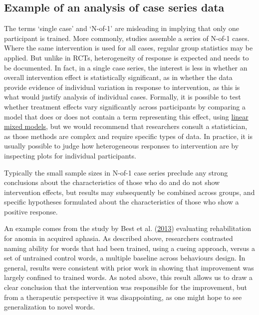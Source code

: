 \documentclass{krantz}
\begin{document}
\hypertarget{example-of-an-analysis-of-case-series-data}{%
\subsection{Example of an analysis of case series data}\label{example-of-an-analysis-of-case-series-data}}

The terms `single case' and `N-of-1' are misleading in implying that only one participant is trained. More commonly, studies assemble a series of N-of-1 cases. Where the same intervention is used for all cases, regular group statistics may be applied. But unlike in RCTs, heterogeneity of response is expected and needs to be documented. In fact, in a single case series, the interest is less in whether an overall intervention effect is statistically significant, as in whether the data provide evidence of individual variation in response to intervention, as this is what would justify analysis of individual cases. Formally, it is possible to test whether treatment effects vary significantly across participants by comparing a model that does or does not contain a term representing this effect, using \href{https://stackoverflow.com/questions/24019807/how-to-compare-a-model-with-no-random-effects-to-a-model-with-a-random-effect-us}{linear mixed models}, but we would recommend that researchers consult a statistician, as those methods are complex and require specific types of data. In practice, it is usually possible to judge how heterogeneous responses to intervention are by inspecting plots for individual participants.

Typically the small sample sizes in N-of-1 case series preclude any strong conclusions about the characteristics of those who do and do not show intervention effects, but results may subsequently be combined across groups, and specific hypotheses formulated about the characteristics of those who show a positive response.

An example comes from the study by Best et al. (\protect\hyperlink{ref-best2013}{2013}) evaluating rehabilitation for anomia in acquired aphasia. As described above, researchers contrasted naming ability for words that had been trained, using a cueing approach, versus a set of untrained control words, a multiple baseline across behaviours design. In general, results were consistent with prior work in showing that improvement was largely confined to trained words. As noted above, this result allows us to draw a clear conclusion that the intervention was responsible for the improvement, but from a therapeutic perspective it was disappointing, as one might hope to see generalization to novel words.
\end{document}
